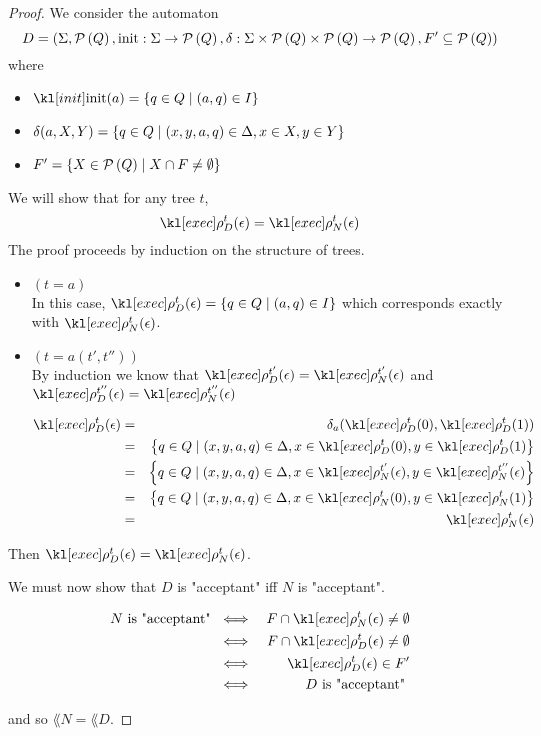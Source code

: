 \documentclass{article}
\begin{document}
\begin{proof}
	We consider the automaton
	$$ D = (\Sigma, \mathcal{P}\left(Q\right), \text{init} : \Sigma \to \mathcal{P}\left(Q\right), \delta : \Sigma \times \mathcal{P}\left(Q\right) \times \mathcal{P}\left(Q\right) \to \mathcal{P}\left(Q\right), F' \subseteq \mathcal{P}\left(Q\right)) $$
	where
	\begin{itemize}
		\item $\init (a) = \setdef {q \in Q} {(a,q) \in I}$
		\item $\delta (a, X, Y) = \left\{q \in  Q \mid (x,y,a,q) \in \Delta, x \in X, y \in Y\right\}$
		\item $F' = \left\{X \in \mathcal{P}\left(Q\right) \mid X \cap F \neq \emptyset\right\}$
	\end{itemize}

	We will show that for any tree $t$,
	$$ \exec D  t (\epsilon)  = \exec N t (\epsilon)$$
	The proof proceeds by induction on the structure of trees.
	\begin{itemize}
		\item $(t = a)$\\
		      In this case, $\exec D t (\epsilon) = \setdef {q \in Q} {(a,q) \in I}$ which corresponds
		      exactly with $\exec N  t (\epsilon)$.

		\item $(t = a(t',t''))$\\
		      By induction we know that
		      $\exec D {t'} (\epsilon) = \exec N {t'} (\epsilon)$
		      and
		      $\exec D {t''} (\epsilon) =  \exec N {t''} (\epsilon)$

		      \begin{eqnarray*}
			      \exec D t (\epsilon) &=& \delta_a(\exec D t (0), \exec D t (1)) \\
			      &=& \setdef {q \in  Q} {(x,y,a,q) \in \Delta, x \in \exec D t (0), y \in \exec D t (1)}\\
			      &=& \setdef {q \in  Q} {(x,y,a,q) \in \Delta, x \in \exec N {t'} (\epsilon), y \in \exec N {t''} (\epsilon)}\\
			      &=& \setdef {q \in  Q} {(x,y,a,q) \in \Delta, x \in \exec N t (0), y \in \exec N t (1)}\\
			      &=& \exec N t (\epsilon)
		      \end{eqnarray*}
	\end{itemize}
	Then $ \exec D t (\epsilon)  = \exec N t (\epsilon)$.


	We must now show that $D$ is "acceptant" iff $N$ is "acceptant".

	\begin{eqnarray*}
		N \text{ is "acceptant" } &\iff& F \cap \exec N t (\epsilon) \neq \emptyset \\
		&\iff& F \cap \exec D t (\epsilon) \neq \emptyset \\
		&\iff& \exec D t (\epsilon) \in F' \\
		&\iff& D \text{ is "acceptant" }
	\end{eqnarray*}

	and so $\lang N = \lang D$.

\end{proof}
\end{document}
